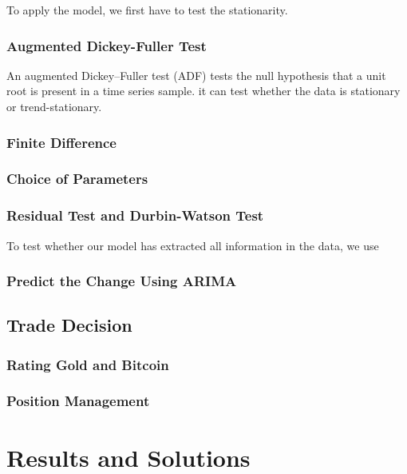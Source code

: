\documentclass[12pt,a4paper]{article}
\newcommand{\Predictor}{ARIMA }
\begin{document}
\begin{spacing}{1.2}
To apply the model, we first have to test the stationarity.

\subsubsection{Augmented Dickey-Fuller Test}

An  augmented Dickey–Fuller test (ADF) tests the null hypothesis that a unit root is present in a time series sample. it can test whether the data is stationary or trend-stationary.

\subsubsection{Finite Difference}

\subsubsection{Choice of Parameters}

\subsubsection{Residual Test and Durbin-Watson Test}
To test whether our model has extracted all information in the data, we use

\subsubsection{Predict the Change Using \Predictor}

\subsection{Trade Decision}

\subsubsection{Rating Gold and Bitcoin}

\subsubsection{Position Management}


\section{Results and Solutions}
\label{Results_Solutions}


\end{spacing}
\end{document}

